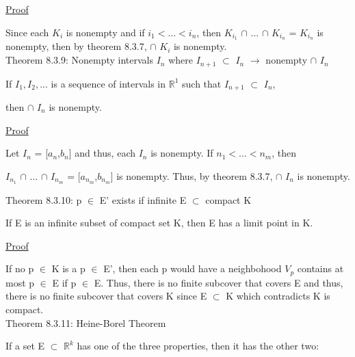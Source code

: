 { \color{magenta} \underline{Proof} } 

	Since each $K_i$ is nonempty and if $i_1 < ... < i_n$, then
	$K_{i_1}$ $\cap$ ... $\cap$ $K_{i_n}$
	= $K_{i_n}$ is nonempty, then
	by {\color{red} theorem 8.3.7}, $\cap$ $K_i$ is nonempty. \\

{ \color{red} Theorem 8.3.9: Nonempty intervals $I_n$ where
$I_{n+1}$ $\subset$ $I_n$ $\rightarrow$ nonempty $\cap$ $I_n$}

	\begin{adjustbox}{minipage=14cm, right, vspace=0.1cm 0cm}
		If $I_1, I_2, ...$ is a sequence of intervals in $\mathbb{R}^1$
		such that $I_{n+1}$ $\subset$ $I_n$,
		
		then $\cap$ $I_n$ is nonempty.
	\end{adjustbox}

{ \color{magenta} \underline{Proof} } 

	Let $I_n$ = [$a_n$,$b_n$] and thus, each $I_n$ is nonempty.
	If $n_1 < ... < n_m$, then

	$I_{n_1}$ $\cap$ ... $\cap$ $I_{n_m}$
	= [$a_{n_m}$,$b_{n_m}$] is nonempty.
	Thus, by {\color{red} theorem 8.3.7}, $\cap$ $I_n$ is nonempty. \\

\newpage

{ \color{red} Theorem 8.3.10: p $\in$ E' exists if
infinite E $\subset$ compact K }

	\begin{adjustbox}{minipage=14cm, right, vspace=0.1cm 0cm}
		If E is an infinite subset of compact set K, then E has a
		limit point in K.
	\end{adjustbox}

{ \color{magenta} \underline{Proof} } 

	If no p $\in$ K is a p $\in$ E', then each p would have
	a neighbohood $V_p$ contains at most p $\in$ E if p $\in$ E.
	Thus, there is no finite subcover that covers E and thus,
	there is no finite subcover that covers K since E $\subset$ K
	which contradicts K is compact. \\

{ \color{red} Theorem 8.3.11: Heine-Borel Theorem } 

	\begin{adjustbox}{minipage=14cm, right, vspace=0.1cm 0cm}
		If a set E $\subset$ $\mathbb{R}^k$ has one of the three properties,
		then it has the other two:
	\end{adjustbox}

